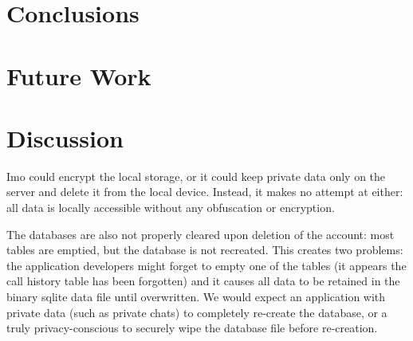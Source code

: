 \documentclass[conference]{IEEEtran}
\begin{document}
\section{Conclusions}\label{sec:conc}

\section{Future Work}\label{sec:futwork}


%


%
%
%


\section{Discussion}


Imo could encrypt the local storage, or it could keep private data only on the
server and delete it from the local device. Instead, it makes no attempt at
either: all data is locally accessible without any obfuscation or encryption.

The databases are also not properly cleared upon deletion of the account: most
tables are emptied, but the database is not recreated. This creates two
problems: the application developers might forget to empty one of the tables
(it appears the call history table has been forgotten) and it causes all data
to be retained in the binary sqlite data file until overwritten. We would
expect an application with private data (such as private chats) to completely
re-create the database, or a truly privacy-conscious to securely wipe the
database file before re-creation.
\end{document}
